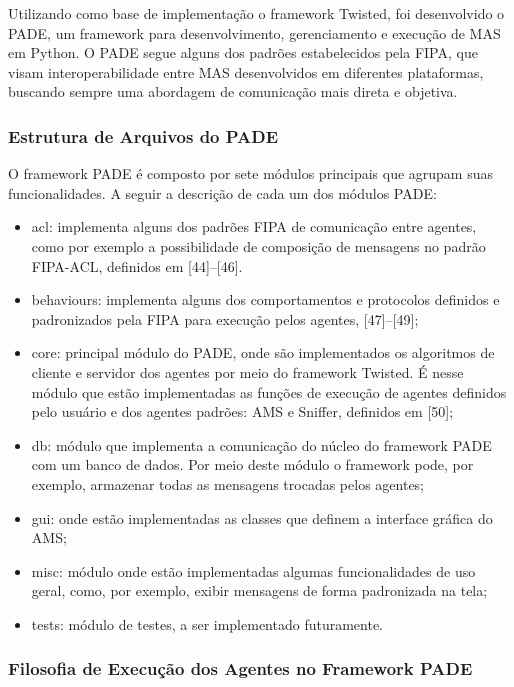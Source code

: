 \documentclass[journal]{IEEEtran}
\begin{document}
Utilizando como base de implementação o framework Twisted, foi desenvolvido o PADE, um framework para desenvolvimento, gerenciamento e execução de MAS em Python. O PADE segue alguns dos padrões estabelecidos pela FIPA, que visam interoperabilidade entre MAS desenvolvidos em diferentes plataformas, buscando sempre uma abordagem de comunicação mais direta e objetiva.

\subsubsection{Estrutura de Arquivos do PADE}

O framework PADE é composto por sete módulos principais que agrupam suas funcionalidades. A seguir a descrição de cada um dos módulos PADE:

\begin{itemize}
  \item acl: implementa alguns dos padrões FIPA de comunicação entre agentes, como por exemplo a possibilidade de composição de mensagens no padrão FIPA-ACL, definidos em [44]–[46].
  \item behaviours: implementa alguns dos comportamentos e protocolos definidos e padronizados pela FIPA para execução pelos agentes, [47]–[49];
  \item core: principal módulo do PADE, onde são implementados os algoritmos de cliente e servidor dos agentes por meio do framework Twisted. É nesse módulo que estão implementadas as funções de execução de agentes definidos pelo usuário e dos agentes padrões: AMS e Sniffer, definidos em [50];
  \item db: módulo que implementa a comunicação do núcleo do framework PADE com um banco de dados. Por meio deste módulo o framework pode, por exemplo, armazenar todas as mensagens trocadas pelos agentes;
  \item gui: onde estão implementadas as classes que definem a interface gráfica do AMS;
  \item misc: módulo onde estão implementadas algumas funcionalidades de uso geral, como, por exemplo, exibir mensagens de forma padronizada na tela;
  \item tests: módulo de testes, a ser implementado futuramente.
\end{itemize}

\subsubsection{Filosofia de Execução dos Agentes no Framework PADE} 
\end{document}
